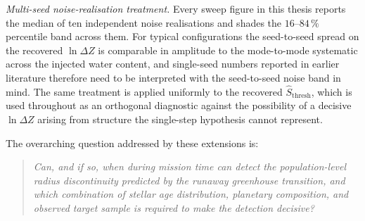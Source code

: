 \emph{Multi-seed noise-realisation treatment.}  Every sweep figure
in this thesis reports the median of ten independent noise
realisations and shades the $16$--$84\,\%$ percentile band across
them.  For typical \PLATO configurations the seed-to-seed spread on
the recovered $\ln\Delta Z$ is comparable in amplitude to the
mode-to-mode systematic across the injected water content, and
single-seed numbers reported in earlier literature therefore need
to be interpreted with the seed-to-seed noise band in mind.  The
same treatment is applied uniformly to the recovered
$\hat{S}_\mathrm{thresh}$, which is used throughout as an
orthogonal diagnostic against the possibility of a decisive
$\ln\Delta Z$ arising from structure the single-step hypothesis
cannot represent.

The overarching question addressed by these extensions is:

\begin{quote}
\emph{Can, and if so, when during mission time can \PLATO detect the population-level radius discontinuity predicted by the runaway greenhouse transition, and which combination of stellar age distribution, planetary composition, and observed target sample is required to make the detection decisive?}
\end{quote}


